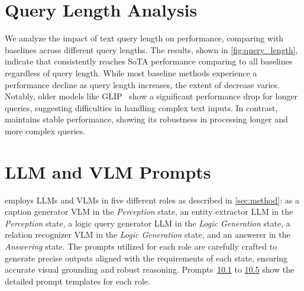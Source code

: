 \section{Query Length Analysis}
\label{sec:supp_query_length}

We analyze the impact of text query length on performance, comparing \methodname{} with baselines across different query lengths. The results, shown in \autoref{fig:query_length}, indicate that \methodname{} consistently reaches SoTA performance comparing to all baselines regardless of query length. While most baseline methods experience a performance decline as query length increases, the extent of decrease varies. Notably, older models like GLIP~\cite{li_grounded_2022} show a significant performance drop for longer queries, suggesting difficulties in handling complex text inputs. In contrast, \methodname{} maintains stable performance, showing its robustness in processing longer and more complex queries.


\section{LLM and VLM Prompts}
\label{sec:supp_prompt}

\methodname{} employs LLMs and VLMs in five different roles as described in \autoref{sec:method}: as a caption generator VLM in the \emph{Perception} state, an entity extractor LLM in the \emph{Perception} state, a logic query generator LLM in the \emph{Logic Generation} state, a relation recognizer VLM in the \emph{Logic Generation} state, and an answerer in the \emph{Answering} state. The prompts utilized for each role are carefully crafted to generate precise outputs aligned with the requirements of each state, ensuring accurate visual grounding and robust reasoning. Prompts~\hyperref[prompt:caption]{10.1} to \hyperref[prompt:answerer]{10.5} show the detailed prompt templates for each role.

